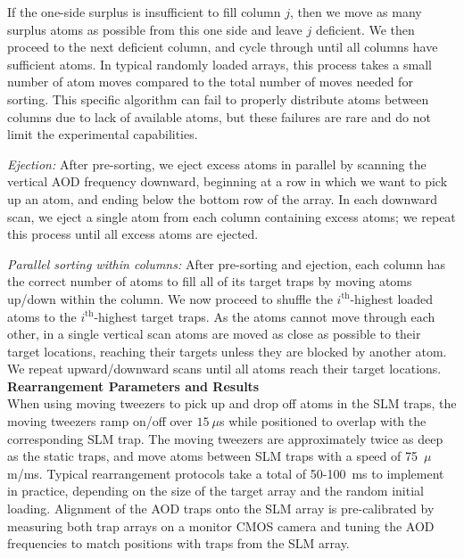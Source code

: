 \documentclass[reprint,twocolumn,secnumarabic,amssymb, aps, prl]{revtex4-1}
\begin{document}
If the one-side surplus is insufficient to fill column $j$, then we move as many surplus atoms as possible from this one side and leave $j$ deficient. We then proceed to the next deficient column, and cycle through until all columns have sufficient atoms.
In typical randomly loaded arrays, this process takes a small number of atom moves compared to the total number of moves needed for sorting. This specific algorithm can fail to properly distribute atoms between columns due to lack of available atoms, but these failures are rare and do not limit the experimental capabilities.%

\emph{Ejection:} After pre-sorting, we eject excess atoms in parallel by scanning the vertical AOD frequency downward, beginning at a row in which we want to pick up an atom, and ending below the bottom row of the array.
In each downward scan, we eject a single atom from each column containing excess atoms; we repeat this process until all excess atoms are ejected.

\emph{Parallel sorting within columns:} After pre-sorting and ejection, each column has the correct number of atoms to fill all of its target traps by moving atoms up/down within the column. We now proceed to shuffle the $i^{\text{th}}$-highest loaded atoms to the $i^{\text{th}}$-highest target traps.
As the atoms cannot move through each other, in a single vertical scan atoms are moved as close as possible to their target locations, reaching their targets unless they are blocked by another atom.
We repeat upward/downward scans until all atoms reach their target locations. \\

\noindent\textbf{Rearrangement Parameters and Results}\\
When using moving tweezers to pick up and drop off atoms in the SLM traps, the moving tweezers ramp on/off over $15~\mu$s while positioned to overlap with the corresponding SLM trap. The moving tweezers are approximately twice as deep as the static traps, and  move atoms between SLM traps with a speed of 75~$\mu$m/ms. Typical rearrangement protocols take a total of 50-100~ms to implement in practice, depending on the size of the target array and the random initial loading.
Alignment of the AOD traps onto the SLM array is pre-calibrated by measuring both trap arrays on a monitor CMOS camera and tuning the AOD frequencies to match positions with traps from the SLM array.
\end{document}
